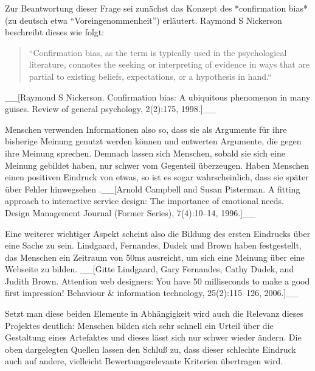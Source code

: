 Zur Beantwortung dieser Frage sei zunächst das Konzept des *confirmation bias* (zu deutsch etwa “Voreingenommenheit”) erläutert. Raymond S Nickerson beschreibt dieses wie folgt:

\begin{quote}
“Confirmation bias, as the term is typically used in the psychological literature, connotes the seeking or interpreting of evidence in ways that are partial to existing beliefs, expectations, or a hypothesis in hand.“
\end{quote}
__[Raymond S Nickerson. Confirmation bias: A ubiquitous phenomenon in many guises. Review of general psychology, 2(2):175, 1998.]__

Menschen verwenden Informationen also so, dass sie als Argumente für ihre bisherige Meinung genutzt werden können und entwerten Argumente, die gegen ihre Meinung sprechen. Demnach lassen sich Menschen, sobald sie sich eine Meinung gebildet haben, nur schwer vom Gegenteil überzeugen.
Haben Menschen einen positiven Eindruck von etwas, so ist es sogar wahrscheinlich, dass sie später über Fehler hinwegsehen .__[Arnold Campbell and Susan Pisterman. A fitting approach to interactive service design: The importance of emotional needs. Design Management Journal (Former Series), 7(4):10–14, 1996.]__

Eine weiterer wichtiger Aspekt scheint also die Bildung des ersten Eindrucks über eine Sache zu sein. Lindgaard, Fernandes, Dudek und Brown haben festgestellt, das Menschen ein Zeitraum von 50ms ausreicht, um sich eine Meinung über eine Webseite zu bilden. __[Gitte Lindgaard, Gary Fernandes, Cathy Dudek, and Judith Brown. Attention web designers: You have 50 milliseconds to make a good first impression! Behaviour & information technology, 25(2):115–126, 2006.]__

Setzt man diese beiden Elemente in Abhängigkeit wird auch die Relevanz dieses Projektes deutlich: Menschen bilden sich sehr schnell ein Urteil über die Gestaltung eines Artefaktes und dieses lässt sich nur schwer wieder ändern.
Die oben dargelegten Quellen lassen den Schluß zu, dass dieser schlechte Eindruck auch auf andere, vielleicht Bewertungsrelevante Kriterien übertragen wird.



